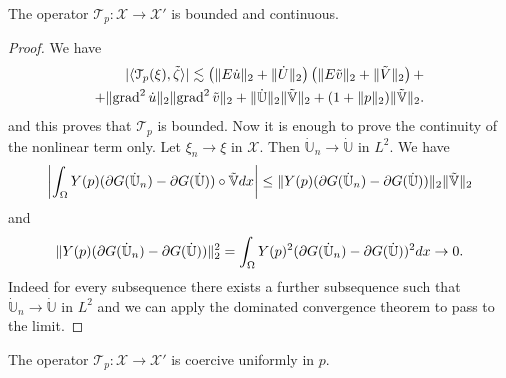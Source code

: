 \begin{lemma}
The operator $\mathcal{T}_p\colon\mathscr{X}\to\mathscr{X}'$ is bounded and continuous.
\end{lemma}
\begin{proof}
We have
\[
\begin{split}
|\langle\mathcal{T}_p(\xi),\tilde{\zeta}\rangle|\lesssim\left(\lVert E\dot u\rVert_2+\lVert\dot U\rVert_2\right)\left(\lVert E\tilde v\rVert_2+\lVert\tilde V\rVert_2\right)+\\
+\lVert\operatorname{grad}^2\dot u\rVert_2\lVert\operatorname{grad}^2\tilde v\rVert_2+\lVert\mathbb{\dot U}\rVert_2\lVert\tilde{\mathbb{V}}\rVert_2+(1+\lVert p\rVert_2)\lVert\tilde{\mathbb{V}}\rVert_2.
\end{split}
\]
and this proves that $\mathcal{T}_p$ is bounded. Now it is enough to prove the continuity of the nonlinear term only. Let $\xi_n\to\xi$ in $\mathscr{X}$. Then $\dot{\mathbb{U}}_n\to\dot{\mathbb{U}}$ in $L^2$. We have
\[
\left|\int_\Omega Y(p)(\partial G(\dot{\mathbb{U}}_n)-\partial G(\dot{\mathbb{U}}))\circ\tilde{\mathbb{V}}dx\right|\le\lVert Y(p)(\partial G(\dot{\mathbb{U}}_n)-\partial G(\dot{\mathbb{U}}))\rVert_2\lVert\tilde{\mathbb{V}}\rVert_2
\]
and
\[
\lVert Y(p)(\partial G(\dot{\mathbb{U}}_n)-\partial G(\dot{\mathbb{U}}))\rVert_2^2=\int_\Omega Y(p)^2(\partial G(\dot{\mathbb{U}}_n)-\partial G(\dot{\mathbb{U}}))^2dx\to0.
\]
Indeed for every subsequence there exists a further subsequence such that $\dot{\mathbb{U}}_n\to\dot{\mathbb{U}}$ in $L^2$ and we can apply the dominated convergence theorem to pass to the limit.
\end{proof}
\begin{lemma}
\label{lemma:coercivity-T}
The operator $\mathcal{T}_p\colon\mathscr{X}\to\mathscr{X}'$ is coercive uniformly in $p$.
\end{lemma}
